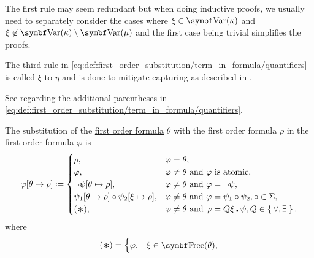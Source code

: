\begin{definition}
\begin{DefEnum}
    The first rule may seem redundant but when doing inductive proofs, we usually need to separately consider the cases where \( \xi \in \Bold{Var}(\kappa) \) and \( \xi \not\in \Bold{Var}(\kappa) \setminus \Bold{Var}(\mu) \) and the first case being trivial simplifies the proofs.

    The third rule in \eqref{eq:def:first_order_substitution/term_in_formula/quantifiers} is called  \( \xi \) to \( \eta \) and is done to mitigate capturing as described in .

    See  regarding the additional parentheses in \eqref{eq:def:first_order_substitution/term_in_formula/quantifiers}.

     The substitution of the \hyperref[def:first_order_language/formula]{first order formula} \( \theta \) with the first order formula \( \rho \) in the first order formula \( \varphi \) is
    \begin{equation}\label{eq:def:first_order_substitution/formula_in_formula}
      \varphi[\theta \mapsto \rho] \coloneqq \begin{cases}
        \rho,                                                       &\varphi = \theta, \\
        \varphi,                                                    &\varphi \neq \theta \T{and} \varphi \text{ is atomic}, \\
        \neg \psi[\theta \mapsto \rho],                             &\varphi \neq \theta \T{and} \varphi = \neg \psi, \\
        \psi_1[\theta \mapsto \rho] \circ \psi_2[\xi \mapsto \rho], &\varphi \neq \theta \T{and} \varphi = \psi_1 \circ \psi_2, \circ \in \Sigma, \\
        (\Ast),                                                     &\varphi \neq \theta \T{and} \varphi = Q \xi \centerdot \psi, Q \in \Set{ \forall, \exists },
      \end{cases}
    \end{equation}
    where
    \begin{equation}\label{eq:def:first_order_substitution/formula_in_formula/quantifiers}
      (\Ast) = \begin{cases}
        \varphi,                                                                      &\xi \in \Bold{Free}(\theta), \\

\end{cases}
\end{equation}
\end{DefEnum}
\end{definition}
